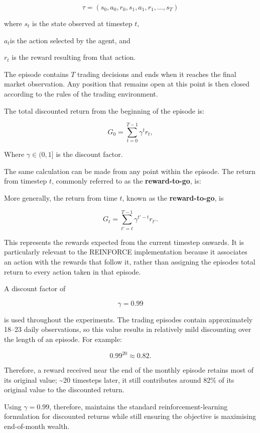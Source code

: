 \[\tau = \left( s_{0},a_{0},r_{0},s_{1},a_{1},r_{1},\ldots,s_{T} \right)\]

where \(s_{t}\) is the state observed at timestep \(t\),

\(a_{t}\)is the action selected by the agent, and

\(r_{t}\) is the reward resulting from that action.

The episode contains \(T\) trading decisions and ends when it reaches
the final market observation. Any position that remains open at this
point is then closed according to the rules of the trading environment.

The total discounted return from the beginning of the episode is:

\[G_{0} = \sum_{t = 0}^{T - 1}\gamma^{t}r_{t},\]

Where \(\gamma \in (0,1\rbrack\) is the discount factor.

The same calculation can be made from any point within the episode. The
return from timestep \(t\), commonly referred to as the
\textbf{reward-to-go}, is:

More generally, the return from time \(t\), known as the
\textbf{reward-to-go}, is

\[G_{t} = \sum_{t' = t}^{T - 1}\gamma^{t' - t}r_{t'}.\]

This represents the rewards expected from the current timestep onwards.
It is particularly relevant to the REINFORCE implementation because it
associates an action with the rewards that follow it, rather than
assigning the episode\textquotesingle s total return to every action
taken in that episode.

A discount factor of

\[\gamma = 0.99\]

is used throughout the experiments. The trading episodes contain
approximately 18--23 daily observations, so this value results in
relatively mild discounting over the length of an episode. For example:

\[{0.99}^{20} \approx 0.82.\]

Therefore, a reward received near the end of the monthly episode retains
most of its original value; \textasciitilde20 timesteps later, it still
contributes around 82\% of its original value to the discounted return.

Using \(\gamma = 0.99\), therefore, maintains the standard
reinforcement-learning formulation for discounted returns while still
ensuring the objective is maximising end-of-month wealth.


